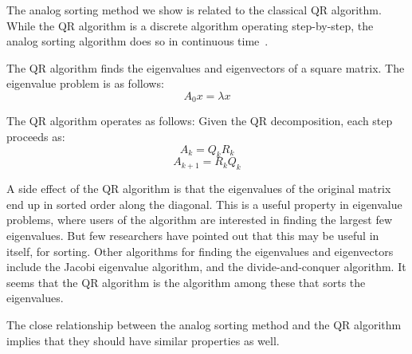 The analog sorting method we show is related to the classical QR algorithm.
While the QR algorithm is a discrete algorithm operating step-by-step, the analog sorting algorithm does so in continuous time~\cite{chu_realization, chu_flows, deift}.

The QR algorithm finds the eigenvalues and eigenvectors of a square matrix.
The eigenvalue problem is as follows:
\[A_0x = \lambda x\]

The QR algorithm operates as follows:
Given the QR decomposition, each step proceeds as:
\[A_k = Q_k R_k\]
\[A_{k+1} = R_k Q_k\]

A side effect of the QR algorithm is that the eigenvalues of the original matrix end up in sorted order along the diagonal.
This is a useful property in eigenvalue problems, where users of the algorithm are interested in finding the largest few eigenvalues.
But few researchers have pointed out that this may be useful in itself, for sorting.
Other algorithms for finding the eigenvalues and eigenvectors include the Jacobi eigenvalue algorithm, and the divide-and-conquer algorithm.
It seems that the QR algorithm is the algorithm among these that sorts the eigenvalues.

The close relationship between the analog sorting method and the QR algorithm implies that they should have similar properties as well.
